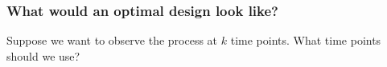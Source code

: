 \documentclass[t,compress]{beamer}
\begin{document}
\begin{frame}
\frametitle{What would an optimal design look like?}
\begin{block}{}
Suppose we want to observe the process at $k$ time points. What time points
should we use?
\end{block}

\begin{figure}[h]
%
%
%
\end{figure}
\end{frame}
\end{document}

